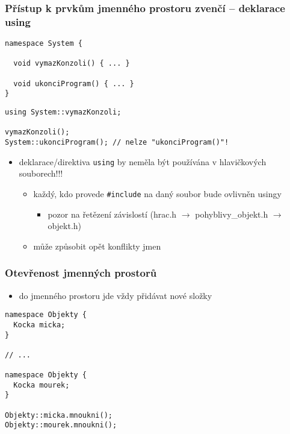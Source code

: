 \begin{frame}[fragile]
\frametitle{Přístup k prvkům jmenného prostoru zvenčí -- deklarace using}
\begin{yesblock}
\begin{lstlisting}
namespace System {

  void vymazKonzoli() { ... }

  void ukonciProgram() { ... }
}
\end{lstlisting}
\end{yesblock}

\begin{yesblock}
\begin{lstlisting}
using System::vymazKonzoli;

vymazKonzoli();
System::ukonciProgram(); // nelze "ukonciProgram()"!
\end{lstlisting}
\end{yesblock}
\end{frame}



\begin{frame}[fragile]
\begin{noblock}
\begin{itemize}
\item deklarace/direktiva \lstinline|using| by neměla být používána v hlavičkových souborech!!!
\begin{itemize}
\item každý, kdo provede \lstinline|#include| na daný soubor bude ovlivněn usingy
\begin{itemize}
\item pozor na řetězení závislostí (hrac.h $\rightarrow$ pohyblivy\_objekt.h $\rightarrow$ objekt.h)
\end{itemize}
\item může způsobit opět konflikty jmen
\end{itemize}
\end{itemize}
\end{noblock}
\end{frame}



\begin{frame}[fragile]
\frametitle{Otevřenost jmenných prostorů}
\begin{block}{}
\begin{itemize}
\item do jmenného prostoru jde vždy přidávat nové složky
\end{itemize}
\end{block}

\begin{yesblock}
\begin{lstlisting}[basicstyle=\small]
namespace Objekty {
  Kocka micka;
}

// ...

namespace Objekty {
  Kocka mourek;
}

Objekty::micka.mnoukni();
Objekty::mourek.mnoukni();
\end{lstlisting}
\end{yesblock}
\end{frame}


